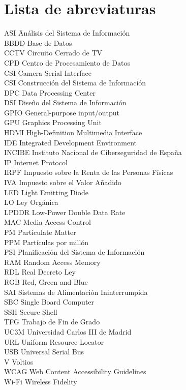 \newpage %
\thispagestyle{empty}
\mbox{}

\chapter*{Lista de abreviaturas}
\begin{tabbing}  %
	ASI \quad\quad\quad\= Análisis del Sistema de Información \\
	BBDD \> Base de Datos \\
	CCTV \> Circuito Cerrado de TV \\
	CPD \> Centro de Procesamiento de Datos \\
	CSI \> Camera Serial Interface \\
	CSI \> Construcción del Sistema de Información \\
	DPC \> Data Processing Center \\
	DSI \> Diseño del Sistema de Información \\
	GPIO \> General-purpose input/output \\
	GPU \> Graphics Processing Unit \\
	HDMI \> High-Definition Multimedia Interface \\
	IDE \> Integrated Development Environment \\
	INCIBE \> Instituto Nacional de Ciberseguridad de España \\
	IP \> Internet Protocol \\
	IRPF \> Impuesto sobre la Renta de las Personas Físicas \\
	IVA \> Impuesto sobre el Valor Añadido \\
	LED \> Light Emitting Diode \\
	LO \> Ley Orgánica \\
	LPDDR \> Low-Power Double Data Rate \\
	MAC \> Media Access Control \\
	PM \> Particulate Matter \\
	PPM \> Partículas por millón \\
	PSI \> Planificación del Sistema de Información \\
	RAM \> Random Access Memory \\
	RDL \> Real Decreto Ley \\
	RGB \> Red, Green and Blue \\
	SAI \> Sistemas de Alimentación Ininterrumpida \\
	SBC \> Single Board Computer \\
	SSH \> Secure Shell \\
	TFG \> Trabajo de Fin de Grado \\
	UC3M \> Universidad Carlos III de Madrid \\
	URL \> Uniform Resource Locator \\
	USB \> Universal Serial Bus \\
	V \> Voltios \\
	WCAG \> Web Content Accessibility Guidelines \\
	Wi-Fi \> Wireless Fidelity
\end{tabbing}